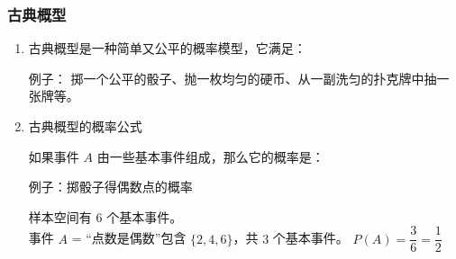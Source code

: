 \subsubsection*{古典概型}
\begin{enumerate}
    \item 古典概型是一种简单又公平的概率模型，它满足：
    \noindent 例子：
    掷一个公平的骰子、抛一枚均匀的硬币、从一副洗匀的扑克牌中抽一张牌等。

    \item 古典概型的概率公式

    如果事件 $A$ 由一些基本事件组成，那么它的概率是：
    
    例子：掷骰子得偶数点的概率
    
    样本空间有 $6$ 个基本事件。\\
    事件 $A$ = “点数是偶数”包含 $ \{2,4,6\} $，共 $3$ 个基本事件。
    $P(A) = \dfrac{3}{6} = \dfrac{1}{2}$
\end{enumerate}